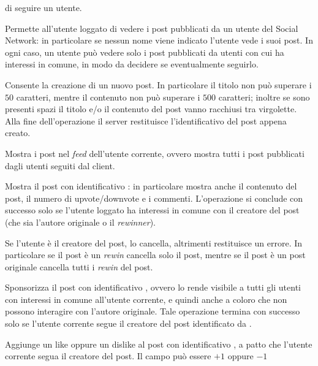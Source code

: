 \documentclass[
    oneside,
    10pt,
    language=italian,
    a4paper,
    article
]{notes}
\begin{document}
\begin{description}
        di seguire un utente.
    \item[\mono{blog [<username>]}] Permette all'utente loggato di vedere i post
        pubblicati da un utente del Social Network: in particolare se nessun nome
        viene indicato l'utente vede i suoi post. In ogni caso, un utente può
        vedere solo i post pubblicati da utenti con cui ha interessi in comune,
        in modo da decidere se eventualmente seguirlo.
    \item[\mono{post <title> <contents>}] Consente la creazione di un nuovo post.
        In particolare il titolo non può superare i $50$ caratteri, mentre il contenuto
        non può superare i $500$ caratteri; inoltre se sono presenti spazi il titolo
        e/o il contenuto del post vanno racchiusi tra virgolette.
        Alla fine dell'operazione il server restituisce l'identificativo del 
        post appena creato.
    \item[\mono{show feed}] Mostra i post nel \emph{feed} dell'utente corrente,
        ovvero mostra tutti i post pubblicati dagli utenti seguiti dal client.
    \item[\mono{show post <idPost>}] Mostra il post con identificativo :
        in particolare mostra anche il contenuto del post, il numero di 
        upvote/downvote e i commenti.  
        L'operazione si conclude con successo solo se l'utente loggato ha interessi
        in comune con il creatore del post (che sia l'autore originale o il 
        \emph{rewinner}).
    \item[\mono{delete <idPost>}] Se l'utente è il creatore del post, lo cancella,
        altrimenti restituisce un errore. In particolare se il post è un \emph{rewin}
        cancella solo il post, mentre se il post è un post originale cancella 
        tutti i \emph{rewin} del post.
    \item[\mono{rewin <idPost>}] Sponsorizza il post con identificativo 
        , ovvero lo rende visibile a tutti gli utenti con interessi
        in comune all'utente corrente, e quindi anche a coloro che non possono
        interagire con l'autore originale. Tale operazione termina con successo
        solo se l'utente corrente segue il creatore del post identificato da
        .
    \item[\mono{rate <idPost> <vote>}] Aggiunge un like oppure un dislike al post
        con identificativo , a patto che l'utente corrente segua
        il creatore del post. Il campo  può essere $+1$ oppure $-1$

\end{description}
\end{document}
